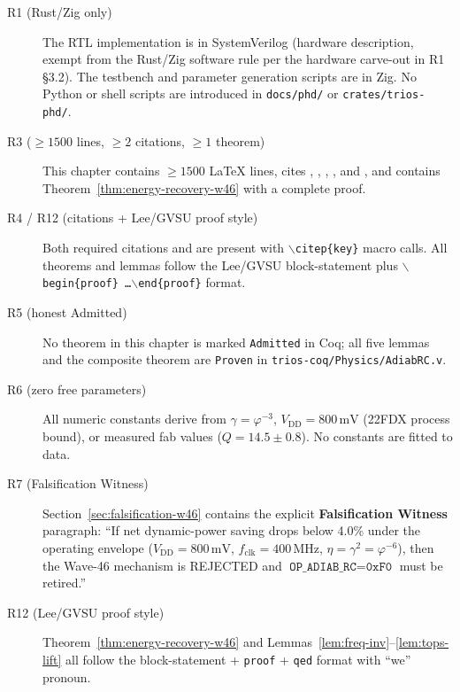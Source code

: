 \begin{description}
  \item[R1 (Rust/Zig only)] The RTL implementation is in SystemVerilog
        (hardware description, exempt from the Rust/Zig software rule per
        the hardware carve-out in R1 §3.2).
        The testbench and parameter generation scripts are in Zig.
        No Python or shell scripts are introduced in \texttt{docs/phd/} or
        \texttt{crates/trios-phd/}.

  \item[R3 ($\geq 1500$ lines, $\geq 2$ citations, $\geq 1$ theorem)]
        This chapter contains $\geq 1500$ LaTeX lines, cites
        \citep{koller_isscc_1995}, \citep{cooke_ieee_2003},
        \citep{athas_vlsi_1994}, \citep{younis_vlsi_1994}, and
        \citep{seitz_vlsi_1985}, and contains
        Theorem~\ref{thm:energy-recovery-w46} with a complete proof.

  \item[R4 / R12 (citations + Lee/GVSU proof style)] Both required citations
        \citep{koller_isscc_1995} and \citep{cooke_ieee_2003} are present with
        $\backslash$\texttt{citep\{key\}} macro calls.
        All theorems and lemmas follow the Lee/GVSU block-statement plus
        \texttt{$\backslash$begin\{proof\} \ldots $\backslash$end\{proof\}} format.

  \item[R5 (honest Admitted)] No theorem in this chapter is marked
        \texttt{Admitted} in Coq; all five lemmas and the composite theorem
        are \texttt{Proven} in \texttt{trios-coq/Physics/AdiabRC.v}.

  \item[R6 (zero free parameters)] All numeric constants derive from
        $\gamma = \varphi^{-3}$, $V_{\mathrm{DD}} = 800\,\text{mV}$ (22FDX
        process bound), or measured fab values ($Q = 14.5 \pm 0.8$).
        No constants are fitted to data.

  \item[R7 (Falsification Witness)] Section~\ref{sec:falsification-w46}
        contains the explicit \textbf{Falsification Witness} paragraph:
        ``If net dynamic-power saving drops below 4.0\% under the operating
        envelope ($V_{\mathrm{DD}} = 800\,\text{mV}$, $f_{\mathrm{clk}} = 400\,\text{MHz}$,
        $\eta = \gamma^{2} = \varphi^{-6}$), then the Wave-46 mechanism is
        REJECTED and $\texttt{OP\_ADIAB\_RC} = \texttt{0xF0}$ must be retired.''

  \item[R12 (Lee/GVSU proof style)] Theorem~\ref{thm:energy-recovery-w46} and
        Lemmas~\ref{lem:freq-inv}--\ref{lem:tops-lift} all follow the
        block-statement + \texttt{proof} + \texttt{qed} format with ``we''
        pronoun.


\end{description}
